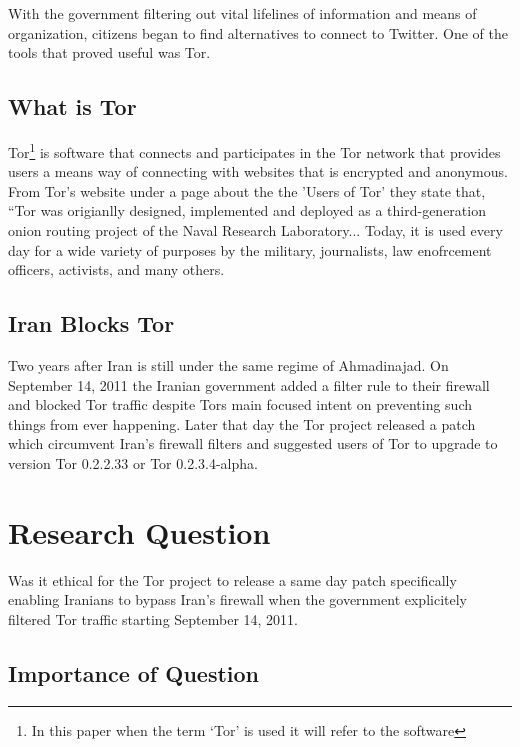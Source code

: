 \documentclass[11pt]{article}
\begin{document}
\begin{multicols}{2}
With the government filtering out vital lifelines of information and means of
organization, citizens began to find alternatives to connect to Twitter. One of
the tools that proved useful was Tor.

\subsection{What is Tor}

Tor\footnote{In this paper when the term `Tor' is used it will refer to the
software} is software that connects and participates in the Tor network that
provides users a means way of connecting with websites that is encrypted and
anonymous. From Tor's website under a page about the the 'Users of Tor' they
state that, ``Tor was origianlly designed, implemented and deployed as a
third-generation onion routing project of the Naval Research Laboratory...
Today, it is used every day for a wide variety of purposes by the military,
journalists, law enofrcement officers, activists, and many others.

\subsection{Iran Blocks Tor}

Two years after Iran is still under the same regime of Ahmadinajad.  On
September 14, 2011 the Iranian government added a filter rule to their firewall
and blocked Tor traffic despite Tors main focused intent on preventing such
things from ever happening. \cite{IranBlocksTorSameDayFix}  Later that day the
Tor project released a patch which circumvent Iran's firewall filters and
suggested users of Tor to upgrade to version Tor 0.2.2.33 or Tor 0.2.3.4-alpha.
\cite{IranBlocksTorSameDayFix}






\section{Research Question} 
Was it ethical for the Tor project to release a same day patch specifically
enabling Iranians to bypass Iran's firewall when the government explicitely
filtered Tor traffic starting September 14, 2011.

\subsection{Importance of Question}


\end{multicols}
\end{document}

